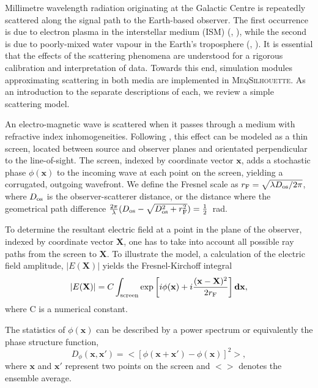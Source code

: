 Millimetre wavelength radiation originating at the Galactic Centre is repeatedly scattered along the signal path to the Earth-based observer. The first occurrence is due to electron plasma in the interstellar medium (ISM) (\citealt{Bower_2006}, \citealt{Gwinn_2014}), while the second is due to poorly-mixed water vapour in the Earth's troposphere (\citealt*{Carilli_1999}, \citealt*{Lay_1997}). It is essential that the effects of the scattering phenomena are understood for a rigorous calibration and interpretation of data.  Towards this end, simulation modules approximating scattering in both media are implemented in \textsc{MeqSilhouette}. As an introduction to the separate descriptions of each, we review a simple scattering model.


An electro-magnetic wave is scattered when it passes through a medium with refractive index inhomogeneities. Following \citet{Narayan_1992}, this effect can be modeled as a thin screen, located between source and observer planes and orientated perpendicular to the line-of-sight. The screen, indexed by coordinate vector $\mathbf{x}$, adds a stochastic phase $\phi(\mathbf{x})$ to the incoming wave at each point on the screen, yielding a corrugated, outgoing wavefront. We define the Fresnel scale as  $r_{\rm F} = \sqrt{\lambda D_{\rm os}/2\pi}$, where $D_{\rm os}$ is the observer-scatterer distance, or the distance where the geometrical path difference $\frac{2\pi}{\lambda} (D_{\rm os} - \sqrt{D_{\rm os}^2 + r_{\rm F}^2}) =\frac{1}{2}$~rad.


To determine the resultant electric field at a point in the plane of the observer, indexed by coordinate vector $\mathbf{X}$, one has to take into account all possible ray paths from the screen to $\mathbf{X}$. To illustrate the model, a calculation of the electric field amplitude, $|E(\mathbf{X})|$ yields the Fresnel-Kirchoff integral \citep*{BORN_1980}
\begin{equation}\label{Fresnel- Kirchoff}
|E(\mathbf{X})| = C \int_{\rm screen} \exp\left[i\phi(\mathbf{x}) + i \frac{(\mathbf{x}-\mathbf{X})^2}{2 r_{\rm F}}\right]\mathbf{dx},
\end{equation}
where C is a numerical constant.


The statistics of $\phi(\mathbf{x})$ can be described by a power spectrum or equivalently the phase structure function,
\begin{equation}\label{eq:D_phi}
D_\phi (\mathbf{x},\mathbf{x'}) = < \left[ \phi(\mathbf{x} +\mathbf{x'}) - \phi(\mathbf{x})\right]^2 >,
\end{equation}
where $\mathbf{x}$ and $\mathbf{x'} $ represent two points on the screen and $<>$ denotes the ensemble average. 

